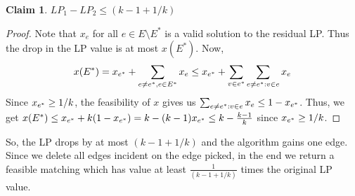 \documentclass[11pt]{article}
\newtheorem{claim}{Claim}
\begin{document}
\begin{claim}
$LP_1 - LP_2 \le (k-1+1/k)$
\end{claim}
\begin{proof}
Note that $x_e$ for all $e\in E\setminus E^*$ is a valid solution to the residual LP. Thus the drop in the LP value is at most $x(E^*)$. Now, 
$$x(E^*) = x_{e^*} + \sum_{e\neq {e^*}, e\in E^*} x_e \le x_{e^*} + \sum_{v\in {e^*}}\sum_{e\neq {e^*}: v\in e} x_e$$
Since $x_{e^*} \ge 1/k$, the feasibility of $x$ gives us $\sum_{e\neq {e^*}: v\in e}x_e \le 1 - x_{e^*}$.
Thus, we get 
$x(E^*) \le x_{e^*} + k(1 - x_{e^*}) = k - (k-1)x_{e^*} \le k - \frac{k-1}{k}$ since $x_{e^*} \ge 1/k$.
\end{proof}

So, the LP drops by at most $(k-1+1/k)$ and the algorithm gains one edge. Since we delete all edges incident on the edge picked, in the end we return a feasible matching which has value at least $\frac{1}{\left(k-1+1/k\right)}$ times the original LP value.
\end{document}

